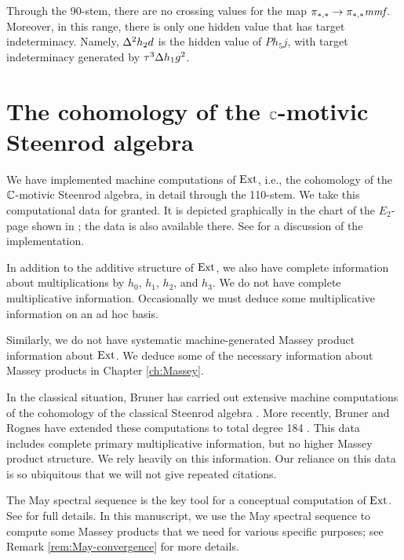 \begin{remark}
Through the 90-stem, there are no crossing values for the map
$\pi_{*,*} \rightarrow \pi_{*,*} \textit{mmf}$.  Moreover, in this range, there is only one hidden value that has target indeterminacy.
Namely, $\Delta^2 h_2 d$ is the hidden value of $P h_5 j$,
with target indeterminacy generated by $\tau^3 \Delta h_1 g^2$.
\end{remark}

\section{The cohomology of the $\mathbb{C}$-motivic Steenrod algebra}

We have implemented machine computations of
$\operatorname{Ext}$, i.e., 
the cohomology of the $\mathbb{C}$-motivic Steenrod algebra,
in detail through the 110-stem.  We take this computational data
for granted.  It is depicted graphically in the chart of the 
$E_2$-page shown in \cite{Isaksen14a}; the data is also available
there.
See \cite{Wang20} for a discussion of the implementation.

In addition to the additive structure of $\operatorname{Ext}$, we also have complete
information about multiplications by $h_0$, $h_1$, $h_2$, and $h_3$.
We do not have complete multiplicative information.  Occasionally we
must deduce some multiplicative information on an ad hoc basis.

Similarly, we do not have systematic machine-generated 
Massey product information about $\operatorname{Ext}$.  We deduce some of the 
necessary information about Massey products in Chapter \ref{ch:Massey}.

In the classical situation, Bruner has carried out extensive
machine computations of the cohomology of the classical Steenrod algebra
\cite{Bruner97}.  More recently, Bruner and Rognes have extended
these computations to total degree 184 \cite{BR20}.
This data includes complete primary multiplicative
information, but no higher Massey product structure.
We rely heavily on this information.
Our reliance on this data is so ubiquitous that we will not give
repeated citations.

The May spectral sequence is the
key tool for a conceptual computation of $\operatorname{Ext}$.  
See \cite{Isaksen14c} for full details.  
In this manuscript, we use the May spectral sequence to
compute some Massey products that we need for various
specific purposes; see Remark \ref{rem:May-convergence}
for more details.

